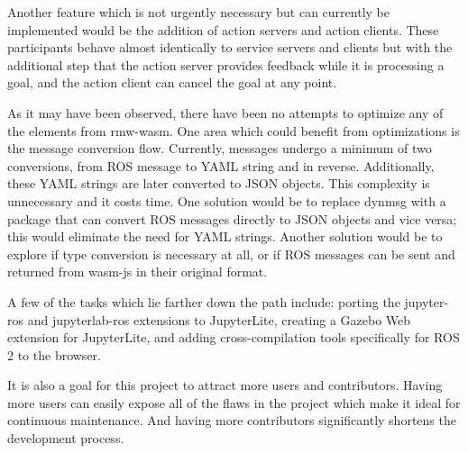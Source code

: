 Another feature which is not urgently necessary but can currently be implemented would be the addition of action servers and action clients. These participants behave almost identically to service servers and clients but with the additional step that the action server provides feedback while it is processing a goal, and the action client can cancel the goal at any point.

As it may have been observed, there have been no attempts to optimize any of the elements from \textsf{rmw-wasm}. One area which could benefit from optimizations is the message conversion flow. Currently, messages undergo a minimum of two conversions, from \ac{ROS} message to \ac{YAML} string and in reverse. Additionally, these \ac{YAML} strings are later converted to \ac{JSON} objects. This complexity is unnecessary and it costs time. One solution would be to replace \textsf{dynmsg} with a package that can convert \ac{ROS} messages directly to \ac{JSON} objects and vice versa; this would eliminate the need for \ac{YAML} strings. Another solution would be to explore if type conversion is necessary at all, or if \ac{ROS} messages can be sent and returned from \textsf{wasm-js} in their original format.

A few of the tasks which lie farther down the path include: porting the \textsf{jupyter-ros} and \textsf{jupyterlab-ros} extensions to JupyterLite, creating a Gazebo Web extension for JupyterLite, and adding cross-compilation tools specifically for \ac{ROS} 2 to the browser.

It is also a goal for this project to attract more users and contributors. Having more users can easily expose all of the flaws in the project which make it ideal for continuous maintenance. And having more contributors significantly shortens the development process.
